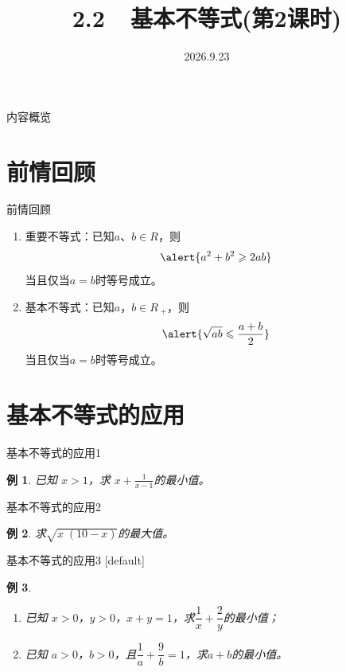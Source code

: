 \documentclass[aspectratio=169,13pt,fleqn] {beamer}
\title[2.2基本不等式]{2.2~~基本不等式(第2课时)}
\author[好好学习，努力向上]{}
\institute{}
\date{2026.9.23}
\newtheorem{instance}{例}   %
\begin{document}
\begin{frame}{}
	\titlepage
\end{frame}

\begin{frame}{内容概览}
	\tableofcontents
\end{frame}

\section{前情回顾}
\begin{frame}{前情回顾}
	
	\begin{enumerate}[(1)]
		\item 重要不等式：已知$a$、$b\in R$，则
		\[
		\alert{a^2 + b^2 \geqslant 2ab}
		\]
		当且仅当$a=b$时等号成立。
		\item 基本不等式：已知$a$，$b\in R_{\;+}$，则
		\[
		\alert{\sqrt{ab} \leqslant \frac{a+b}{2}}
		\]
		当且仅当$a=b$时等号成立。
	\end{enumerate}
	
\end{frame}

\section{基本不等式的应用}
\begin{frame}[t]{基本不等式的应用1}
	\begin{instance}
		已知 $x>1$，求 $x+\frac{1}{x-1}$的最小值。
	\end{instance}
	
	
\end{frame}

\begin{frame}[t]{基本不等式的应用2}
	\begin{instance}
		求$\sqrt{x\;(10-x)}$的最大值。
	\end{instance}
	
	
\end{frame}

\begin{frame}[t]{基本不等式的应用3}
	[default]
	\begin{instance}
		

	\begin{enumerate}[(1)]
		\item 已知 $x>0$，$y>0$，$x+y=1$，求$\dfrac{1}{x}+\dfrac{2}{y}$的最小值；
		\item 已知 $a>0$，$b>0$，且$\dfrac{1}{a}+\dfrac{9}{b} = 1$，求$a+b$的最小值。
	\end{enumerate}	
	\end{instance}
\end{frame}
\end{document}
